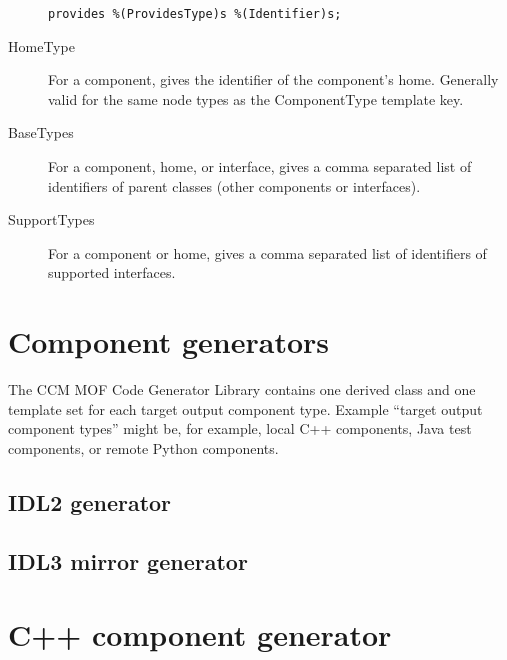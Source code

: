 \begin{description}
\begin{verbatim}
provides %(ProvidesType)s %(Identifier)s;
\end{verbatim}

\item [HomeType] For a component, gives the identifier of the component's home.
      Generally valid for the same node types as the ComponentType template key.

\item [BaseTypes] For a component, home, or interface, gives a comma separated
      list of identifiers of parent classes (other components or interfaces).

\item [SupportTypes] For a component or home, gives a comma separated list of
      identifiers of supported interfaces.

\end{description}

\section{Component generators}

The CCM MOF Code Generator Library contains one derived class and one template
set for each target output component type. Example ``target output component
types'' might be, for example, local C++ components, Java test components, or
remote Python components.

\subsection{IDL2 generator}



\subsection{IDL3 mirror generator}



\section{C++ component generator}










